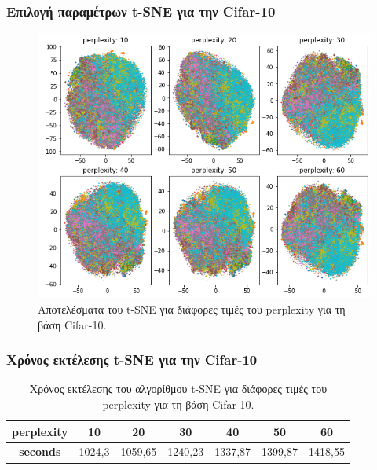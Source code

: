 \documentclass{beamer}
\begin{document}
\begin{frame}
\frametitle{Επιλογή παραμέτρων t-SNE για την Cifar-10}

\begin{figure}[H]
    \centering
    \includegraphics[width=0.6\linewidth]{cifar/tsne_all.png}
    \caption{Αποτελέσματα του t-SNE για διάφορες τιμές του perplexity για τη
    βάση Cifar-10.}
    \label{fig:cifar_tsne_all}
\end{figure}

\end{frame}

\begin{frame}
\frametitle{Χρόνος εκτέλεσης t-SNE για την Cifar-10}

\small
\begin{table}[H]
\centering
\begin{tabular}{|c|c|c|c|c|c|c|}
\hline
\textbf{perplexity} & \textbf{10} & \textbf{20} & \textbf{30} & \textbf{40} & \textbf{50} & \textbf{60} \\ \hline
\textbf{seconds}    & 1024,3      & 1059,65     & 1240,23     & 1337,87     & 1399,87     & 1418,55     \\ \hline
\end{tabular}
\caption{Χρόνος εκτέλεσης του αλγορίθμου t-SNE για διάφορες τιμές του perplexity
    για τη βάση Cifar-10.}
\label{tab:cifar_tsne_times}
\end{table}

\end{frame}
\end{document}
